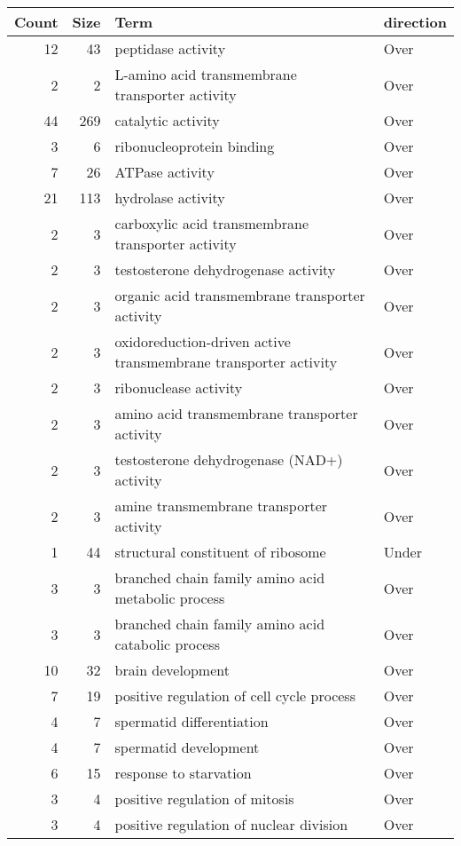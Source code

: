 \documentclass[10pt]{bmc_article}
\newenvironment{bmcformat}{\begin{raggedright}\baselineskip20pt\sloppy\setboolean{publ}{false}}{\end{raggedright}\baselineskip20pt\sloppy}
\begin{document}
\begin{bmcformat}
\begin{longtable}{rrll}
 Count & Size & Term & direction \\ 
  \hline
 12 &  43 & peptidase activity & Over \\ 
    2 &   2 & L-amino acid transmembrane transporter activity & Over \\ 
   44 & 269 & catalytic activity & Over \\ 
    3 &   6 & ribonucleoprotein binding & Over \\ 
    7 &  26 & ATPase activity & Over \\ 
   21 & 113 & hydrolase activity & Over \\ 
    2 &   3 & carboxylic acid transmembrane transporter activity & Over \\ 
    2 &   3 & testosterone dehydrogenase activity & Over \\ 
    2 &   3 & organic acid transmembrane transporter activity & Over \\ 
    2 &   3 & oxidoreduction-driven active transmembrane transporter activity & Over \\ 
    2 &   3 & ribonuclease activity & Over \\ 
    2 &   3 & amino acid transmembrane transporter activity & Over \\ 
    2 &   3 & testosterone dehydrogenase (NAD+) activity & Over \\ 
    2 &   3 & amine transmembrane transporter activity & Over \\ 
    1 &  44 & structural constituent of ribosome & Under \\ 
   \hline
  3 &   3 & branched chain family amino acid metabolic process & Over \\ 
    3 &   3 & branched chain family amino acid catabolic process & Over \\ 
   10 &  32 & brain development & Over \\ 
    7 &  19 & positive regulation of cell cycle process & Over \\ 
    4 &   7 & spermatid differentiation & Over \\ 
    4 &   7 & spermatid development & Over \\ 
    6 &  15 & response to starvation & Over \\ 
    3 &   4 & positive regulation of mitosis & Over \\ 
    3 &   4 & positive regulation of nuclear division & Over \\ 

\end{longtable}
\end{bmcformat}
\end{document}
